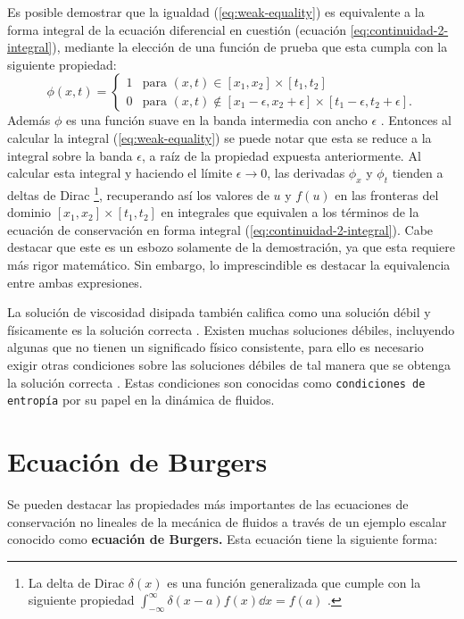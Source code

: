 Es posible demostrar que la igualdad (\ref{eq:weak-equality}) es equivalente a la forma integral de la ecuación diferencial en cuestión (ecuación \ref{eq:continuidad-2-integral}), mediante la elección de una función de prueba que esta cumpla con la siguiente propiedad:
\begin{equation}
	\phi(x,t) = 
	\begin{cases}
		1 & \text{para } (x,t) \in [x_1, x_2] \times [t_1, t_2]\\
		0 & \text{para } (x,t) \notin [x_1 - \epsilon, x_2 + \epsilon] \times [t_1 - \epsilon, t_2 + \epsilon].
 	\end{cases}
\end{equation}
Además $\phi$ es una función suave en la banda intermedia con ancho $\epsilon$ \cite{Leveque}. Entonces al calcular la integral (\ref{eq:weak-equality})  se puede notar que esta se reduce a la integral sobre la banda $\epsilon$, a raíz de la propiedad expuesta anteriormente. Al calcular esta integral y haciendo el límite $\epsilon \rightarrow 0$, las derivadas $\phi_x$ y $\phi_t$ tienden a deltas de Dirac \footnote{La delta de Dirac $\delta(x)$ es una función generalizada que cumple con la siguiente propiedad $\int_{-\infty}^{\infty} \delta(x-a) f(x)\dd{x} = f(a)$ \cite{methods}.}, recuperando así los valores de $u$ y $ f(u)$ en las fronteras del dominio $ [x_1, x_2] \times [t_1, t_2]$ en integrales que equivalen a los términos de la ecuación de conservación en forma integral (\ref{eq:continuidad-2-integral})\cite{Leveque}. Cabe destacar que este es un esbozo solamente de la demostración, ya que esta requiere más rigor matemático. Sin embargo, lo imprescindible es destacar la equivalencia entre ambas expresiones.

La solución de viscosidad disipada también califica como una solución débil y físicamente es la solución correcta \cite{Leveque}. Existen muchas soluciones débiles, incluyendo algunas que no tienen un significado físico consistente, para ello es necesario exigir otras condiciones sobre las soluciones débiles de tal manera que se obtenga la solución correcta \cite{Leveque}. Estas condiciones son conocidas como \texttt{condiciones de entropía} por su papel en la dinámica de fluidos.

\section{Ecuación de Burgers}
Se pueden destacar las propiedades más importantes de las ecuaciones de conservación no lineales de la mecánica de fluidos a través de un ejemplo escalar conocido como \textbf{ecuación de Burgers.} Esta ecuación tiene la siguiente forma:

